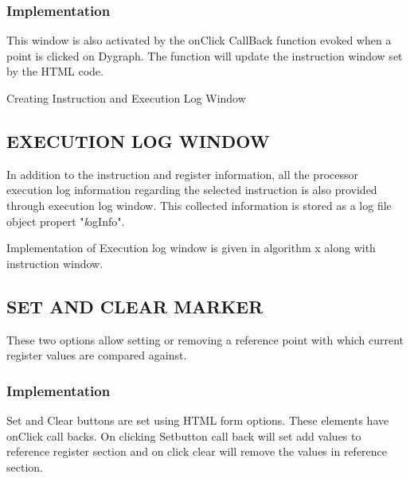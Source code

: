 \subsubsection{Implementation}

This window is also activated by the onClick CallBack function evoked when a point is clicked on Dygraph. The function will update the instruction window set by the HTML code.

\IncMargin{1em}
\begin{algorithm}[H]
\DontPrintSemicolon
{} 
\caption{Creating Instruction and Execution Log Window}
\end{algorithm}\DecMargin{1em}

\subsection {EXECUTION LOG WINDOW}

In addition to the instruction and register information, all the processor execution log information regarding the selected
instruction is also provided through execution log window.  This collected information is stored as a log file object propert "{\emph logInfo}". 

Implementation of Execution log window is given in algorithm x along with instruction window.

\subsection{SET AND CLEAR MARKER}
These two options allow setting or removing a reference point with which current register values are compared against.

\subsubsection{Implementation}

Set and Clear buttons are set using HTML form options. These elements have onClick call backs. On clicking Setbutton call back will set add values to reference register section and on click clear will remove the values in reference section.



